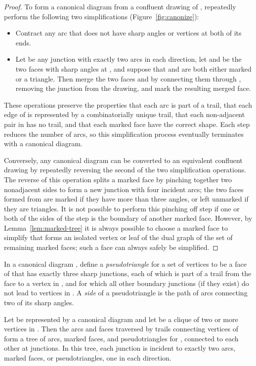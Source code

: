 \documentclass{llncs}
\begin{document}
\begin{proof}
To form a canonical diagram from a confluent drawing of , repeatedly perform the following two simplifications (Figure~\ref{fig:canonize}):
\begin{itemize}
\item Contract any arc that does not have sharp angles or vertices at both of its ends.
\item Let  be any junction with exactly two arcs in each direction, let  and  be the two faces with sharp angles at , and suppose that  and  are both either marked or a triangle. Then merge the two faces  and  by connecting them through , removing the junction from the drawing, and mark the resulting merged face.
\end{itemize}
These operations preserve the properties that each arc is part of a trail, that each edge of  is represented by a combinatorially unique trail, that each non-adjacent pair in  has no trail, and that each marked face have the correct shape. Each step reduces the number of arcs, so this simplification process eventually terminates with a canonical diagram.

Conversely, any canonical diagram can be converted to an equivalent confluent drawing by repeatedly reversing the second of the two simplification operations. The reverse of this operation splits a marked face  by pinching together two nonadjacent sides to form a new junction with four incident arcs; the two faces formed from  are marked if they have more than three angles, or left unmarked if they are triangles. It is not possible to perform this pinching off step if one or both of the sides of the step is the boundary of another marked face. However, by Lemma~\ref{lem:marked-tree} it is always possible to choose a marked face to simplify that forms an isolated vertex or leaf of the dual graph of the set of remaining marked faces; such a face can always safely be simplified.
\end{proof}

In a canonical diagram , define a \emph{pseudotriangle} for a set  of vertices to be a face of  that has exactly three sharp junctions, each of which is part of a trail from the face to a vertex in , and for which all other boundary junctions (if they exist) do not lead to vertices in . A \emph{side} of a pseudotriangle is the path of arcs connecting two of its sharp angles.

\begin{lemma}
\label{lem:candy-clique}
Let  be represented by a canonical diagram  and let  be a clique of two or more vertices in .
Then the arcs and faces traversed by trails connecting vertices of  form a tree of arcs, marked faces, and pseudotriangles for , connected to each other at junctions. In this tree, each junction is incident to exactly two arcs, marked faces, or pseudotriangles, one in each direction.
\end{lemma}
\end{document}
